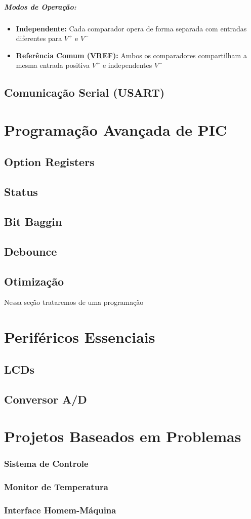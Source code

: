 \documentclass[12pt,a4paper]{book}
\begin{document}
\paragraph{Modos de Operação:}
\begin{itemize}
    \item \textbf{Independente:} Cada comparador opera de forma separada com entradas diferentes para $V^+$ e $V^-$
    \item \textbf{Referência Comum \textbf{(VREF)}:} Ambos os comparadores compartilham a mesma entrada positiva $V^+$ e independentes $V^-$
\end{itemize}
\section{Comunicação Serial (USART)}
\chapter{Programação Avançada de PIC}
\section{Option Registers}
\section{Status}
\section{Bit Baggin}
\section{Debounce}
\section{Otimização}
Nessa seção trataremos de uma programação
\chapter{Periféricos Essenciais}
\section{LCDs}
\section{Conversor A/D}

\chapter{Projetos Baseados em Problemas}
\subsection{Sistema de Controle}
\subsection{Monitor de Temperatura}
\subsection{Interface Homem-Máquina}
\end{document}
